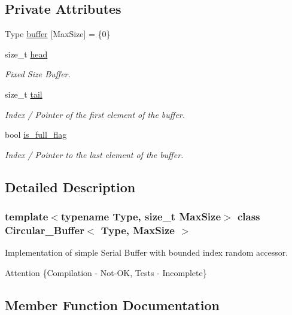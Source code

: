 \subsection*{Private Attributes}
\begin{DoxyCompactItemize}
\item 
Type \hyperlink{classCircular__Buffer_a87052e6c88b063be5bac3c2d4fc82989}{buffer} \mbox{[}Max\+Size\mbox{]} = \{0\}
\item 
size\+\_\+t \hyperlink{classCircular__Buffer_aba63ebc4317ca05a35cfbd36e9291787}{head}
\begin{DoxyCompactList}\small\item\em Fixed Size Buffer. \end{DoxyCompactList}\item 
size\+\_\+t \hyperlink{classCircular__Buffer_a6eb4d6b77a513a6b9bd8465197e48ad4}{tail}
\begin{DoxyCompactList}\small\item\em Index / Pointer of the first element of the buffer. \end{DoxyCompactList}\item 
bool \hyperlink{classCircular__Buffer_ad7a89f42768bbc146159221a0f101154}{is\+\_\+full\+\_\+flag}
\begin{DoxyCompactList}\small\item\em Index / Pointer to the last element of the buffer. \end{DoxyCompactList}\end{DoxyCompactItemize}


\subsection{Detailed Description}
\subsubsection*{template$<$typename Type, size\+\_\+t Max\+Size$>$\newline
class Circular\+\_\+\+Buffer$<$ Type, Max\+Size $>$}

Implementation of simple Serial Buffer with bounded index random accessor. 

\begin{DoxyAttention}{Attention}
\{Compilation -\/ Not-\/\+OK, Tests -\/ Incomplete\} 
\end{DoxyAttention}


\subsection{Member Function Documentation}
\mbox{\label{classCircular__Buffer_a4ec86fd625e56d17abe155895cc4cc1b}} 
